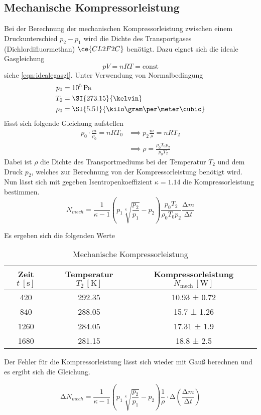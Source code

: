 \subsection{Mechanische Kompressorleistung}
Bei der Berechnung der mechanischen Kompressorleistung zwischen einem Druckunterschied $p_{2} - p_{1}$ wird die Dichte des Transportgases (Dichlordifluormethan) $\ce{CL2F2C}$ benötigt.
Dazu eignet sich die ideale Gasgleichung
\begin{equation}
pV = n R T = \text{const}
\end{equation}
siehe \eqref{eqn:idealegasgl}. Unter Verwendung von Normalbedingung
\begin{align}
p_{0} &= 10^{5} \, \text{Pa} \\
T_{0} &= \SI{273.15}{\kelvin} \\
\rho_{0} &= \SI{5.51}{\kilo\gram\per\meter\cubic}
\end{align}
lässt sich folgende Gleichung aufstellen
\begin{align}
p_{0} \cdot \frac{m}{\rho_{0}} = nR T_{0} &\implies p_{2} \frac{m}{\rho} = nR T_{2} \\
&\implies \rho = \frac{\rho_{0}T_{0}p_{2}}{p_{0}T_{2}}
\end{align}
Dabei ist $\rho$ die Dichte des Transportmediums bei der Temperatur $T_{2}$ und dem Druck $p_{2}$, welches zur Berechnung von der Kompressorleistung benötigt wird.
Nun lässt sich mit gegeben Isentropenkoeffizient $\kappa = 1.14$ die Kompressorleistung bestimmen.
\begin{equation}
N_{mech} = \frac{1}{\kappa - 1} \left( p_{1}\sqrt[\kappa]{\frac{p_{2}}{p_{1}}} - p_{2} \right) \frac{p_{0}T_{2}}{\rho_{0}T_{0}p_{2}} \frac{\increment m}{\increment t}
\end{equation}
\begin{flushleft}
Es ergeben sich die folgenden Werte
\end{flushleft}
\begin{table}
  \centering
  \caption{Mechanische Kompressorleistung}
  \label{tab:mechkompr}
  \begin{tabular}{c c c}
    \toprule
    Zeit {$t \: [\si{\second}]$} & Temperatur $T_{2} \, [\si{\kelvin}]$ & Kompressorleistung $N_\text{mech} \, [\si{\watt}]$ \\
    \midrule
    420  & 292.35 & 10.93 ± 0.72 \\
    840  & 288.05 & 15.7 ± 1.26 \\
    1260  &  284.05 & 17.31 ± 1.9 \\
    1680 &  281.15 & 18.8 ± 2.5\\
    \bottomrule
  \end{tabular}
\end{table}
\begin{flushleft}
Der Fehler für die Kompressorleistung lässt sich wieder mit Gauß berechnen und es ergibt sich die Gleichung.
\end{flushleft}
\begin{equation}
  \increment N_{mech} = \frac{1}{\kappa - 1} \left( p_{1}\sqrt[\kappa]{\frac{p_{2}}{p_{1}}} - p_{2} \right) \frac{1}{\rho} \cdot \increment \left( \frac{\increment m}{\increment t} \right)
\end{equation}
